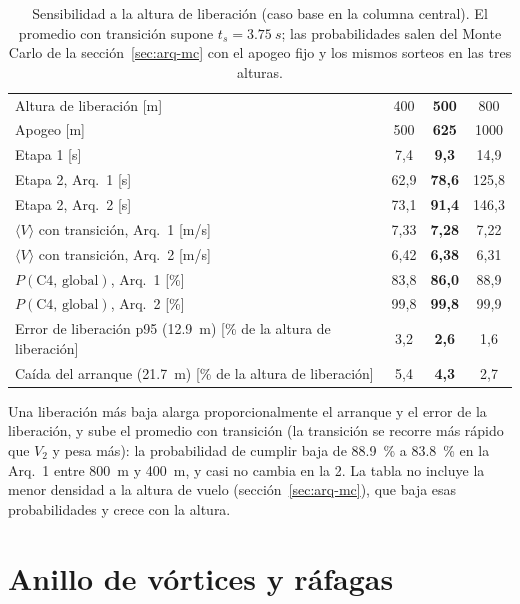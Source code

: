 \begin{table}[H]
\centering\small
\caption{Sensibilidad a la altura de liberación (caso base en la columna central). El promedio con
transición supone $t_s=\SI{3.75}{s}$; las probabilidades salen del Monte Carlo de la
sección~\ref{sec:arq-mc} con el apogeo fijo y los mismos sorteos en las tres alturas.}\label{tab:sens-altura}
\begin{tabular}{@{}lccc@{}}
\toprule
Altura de liberación [m] & 400 & \textbf{500} & 800\\
Apogeo [m] & 500 & \textbf{625} & 1000\\\midrule
Etapa 1 [s] & 7,4 & \textbf{9,3} & 14,9\\
Etapa 2, Arq.~1 [s] & 62,9 & \textbf{78,6} & 125,8\\
Etapa 2, Arq.~2 [s] & 73,1 & \textbf{91,4} & 146,3\\
$\langle V\rangle$ con transición, Arq.~1 [m/s] & 7,33 & \textbf{7,28} & 7,22\\
$\langle V\rangle$ con transición, Arq.~2 [m/s] & 6,42 & \textbf{6,38} & 6,31\\
$P(\text{C4, global})$, Arq.~1 [\%] & 83,8 & \textbf{86,0} & 88,9\\
$P(\text{C4, global})$, Arq.~2 [\%] & 99,8 & \textbf{99,8} & 99,9\\
Error de liberación p95 (\SI{12.9}{m}) [\% de la altura de liberación] & 3,2 & \textbf{2,6} & 1,6\\
Caída del arranque (\SI{21.7}{m}) [\% de la altura de liberación] & 5,4 & \textbf{4,3} & 2,7\\
\bottomrule
\end{tabular}
\end{table}

Una liberación más baja alarga proporcionalmente el arranque y el error de la liberación, y
sube el promedio con transición (la transición se recorre más rápido que $V_2$ y pesa más): la
probabilidad de cumplir baja de \SI{88.9}{\percent} a \SI{83.8}{\percent} en la Arq.~1 entre
\SI{800}{m} y \SI{400}{m}, y casi no cambia en la 2. La tabla no incluye la menor densidad a la
altura de vuelo (sección~\ref{sec:arq-mc}), que baja esas probabilidades y crece con la altura.

\section{Anillo de vórtices y ráfagas}\label{sec:sens-vrs}

